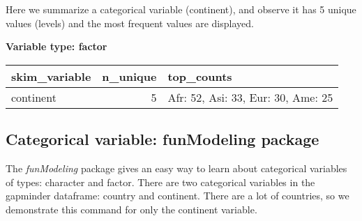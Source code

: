 \documentclass[
]{book}
\newenvironment{Shaded}{\begin{snugshade}}{\end{snugshade}}
\newcommand{\CommentTok}[1]{\textcolor[rgb]{0.56,0.35,0.01}{\textit{#1}}}
\newcommand{\DecValTok}[1]{\textcolor[rgb]{0.00,0.00,0.81}{#1}}
\newcommand{\KeywordTok}[1]{\textcolor[rgb]{0.13,0.29,0.53}{\textbf{#1}}}
\newcommand{\NormalTok}[1]{#1}
\newcommand{\OperatorTok}[1]{\textcolor[rgb]{0.81,0.36,0.00}{\textbf{#1}}}
\newcommand{\StringTok}[1]{\textcolor[rgb]{0.31,0.60,0.02}{#1}}
\begin{document}
Here we summarize a categorical variable (continent), and observe it has 5 unique values (levels) and the most frequent values are displayed.

\begin{Shaded}
\end{Shaded}

\textbf{Variable type: factor}

\begin{tabular}{l|r|l}
\hline
skim\_variable & n\_unique & top\_counts\\
\hline
continent & 5 & Afr: 52, Asi: 33, Eur: 30, Ame: 25\\
\hline
\end{tabular}

\hypertarget{categorical-variable-funmodeling-package}{%
\subsection{Categorical variable: funModeling package}\label{categorical-variable-funmodeling-package}}

The \emph{funModeling} package gives an easy way to learn about categorical variables of types: character and factor. There are two categorical variables in the gapminder
dataframe: country and continent. There are a lot of countries, so we demonstrate
this command for only the continent variable.

\begin{Shaded}
\end{Shaded}
\end{document}
